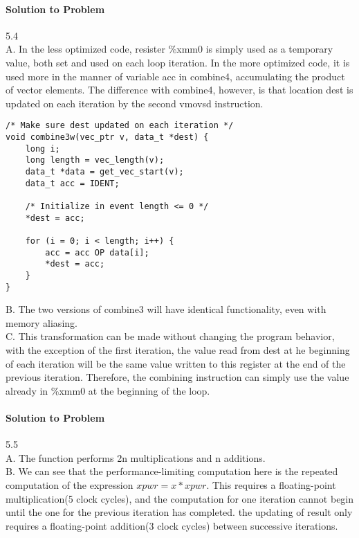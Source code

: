 \documentclass{report}
\begin{document}
\paragraph{Solution to Problem } 5.4\\
A. In the less optimized code, resister \%xmm0 is simply used as a temporary value, both set and used on each loop iteration. In the more optimized code, it is used more in the manner of variable acc in combine4, accumulating the product of vector elements. The difference with combine4, however, is that location dest is updated on each iteration by the second vmovsd instruction. \\
\begin{lstlisting}
/* Make sure dest updated on each iteration */
void combine3w(vec_ptr v, data_t *dest) {
	long i;
	long length = vec_length(v);
	data_t *data = get_vec_start(v);
	data_t acc = IDENT;

	/* Initialize in event length <= 0 */
	*dest = acc;

	for (i = 0; i < length; i++) {
		acc = acc OP data[i];
		*dest = acc;
	}
}
\end{lstlisting}
B. The two versions of combine3 will have identical functionality, even with memory aliasing. \\
C. This transformation can be made without changing the program behavior, with the exception of the first iteration, the value read from dest at he beginning of each iteration will be the same value written to this register at the end of the previous iteration. Therefore, the combining instruction can simply use the value already in \%xmm0 at the beginning of the loop. \\

\paragraph{Solution to Problem } 5.5\\
A. The function performs 2n multiplications and n additions. \\
B. We can see that the performance-limiting computation here is the repeated computation of the expression $xpwr = x * xpwr$. This requires a floating-point multiplication(5 clock cycles), and the computation for one iteration cannot begin until the one for the previous iteration has completed. the updating of result only requires a floating-point addition(3 clock cycles) between successive iterations. \\
\end{document}
